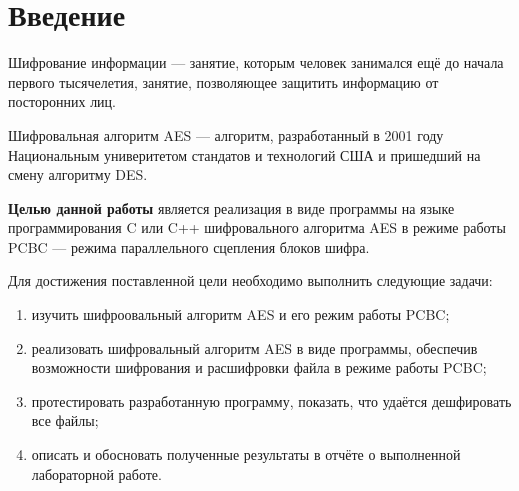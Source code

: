 \chapter*{Введение}

Шифрование информации --- занятие, которым человек занимался ещё до начала первого тысячелетия, занятие, позволяющее защитить информацию от посторонних лиц. 

Шифровальная алгоритм AES --- алгоритм, разработанный в 2001 году Национальным универитетом стандатов и технологий США и пришедший на смену алгоритму DES.

\textbf{Целью данной работы} является реализация в виде программы на языке программирования C или C++ шифровального алгоритма AES в режиме работы PCBC --- режима параллельного сцепления блоков шифра.

Для достижения поставленной цели необходимо выполнить следующие задачи:
\begin{enumerate}[label=\arabic*)]
	\item изучить шифроовальный алгоритм AES и его режим работы PCBC;
    \item реализовать шифровальный алгоритм AES в виде программы, обеспечив возможности шифрования и расшифровки файла в режиме работы PCBC;
	\item протестировать разработанную программу, показать, что удаётся дешфировать все файлы;
	\item описать и обосновать полученные результаты в отчёте о выполненной лабораторной работе.
\end{enumerate}
